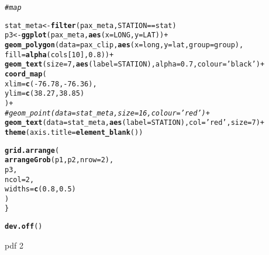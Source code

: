 \documentclass[letterpaper,12pt]{article}\usepackage[]{graphicx}\usepackage[]{color}
\makeatletter
\newcommand{\hlnum}[1]{\textcolor[rgb]{0.686,0.059,0.569}{#1}}%
\newcommand{\hlstr}[1]{\textcolor[rgb]{0.192,0.494,0.8}{#1}}%
\newcommand{\hlcom}[1]{\textcolor[rgb]{0.678,0.584,0.686}{\textit{#1}}}%
\newcommand{\hlopt}[1]{\textcolor[rgb]{0,0,0}{#1}}%
\newcommand{\hlstd}[1]{\textcolor[rgb]{0.345,0.345,0.345}{#1}}%
\newcommand{\hlkwb}[1]{\textcolor[rgb]{0.69,0.353,0.396}{#1}}%
\newcommand{\hlkwc}[1]{\textcolor[rgb]{0.333,0.667,0.333}{#1}}%
\newcommand{\hlkwd}[1]{\textcolor[rgb]{0.737,0.353,0.396}{\textbf{#1}}}%
\newenvironment{kframe}{%
 \def\at@end@of@kframe{}%
 \ifinner\ifhmode%
  \def\at@end@of@kframe{\end{minipage}}%
  \begin{minipage}{\columnwidth}%
 \fi\fi%
 \def\FrameCommand##1{\hskip\@totalleftmargin \hskip-\fboxsep
 \colorbox{shadecolor}{##1}\hskip-\fboxsep
     \hskip-\linewidth \hskip-\@totalleftmargin \hskip\columnwidth}%
 \MakeFramed {\advance\hsize-\width
   \@totalleftmargin\z@ \linewidth\hsize
   \@setminipage}}%
 {\par\unskip\endMakeFramed%
 \at@end@of@kframe}
\makeatother
\begin{document}
\begin{kframe}
\begin{alltt}
  \hlcom{# map}

  \hlstd{stat_meta} \hlkwb{<-} \hlkwd{filter}\hlstd{(pax_meta, STATION} \hlopt{==} \hlstd{stat)}
  \hlstd{p3} \hlkwb{<-} \hlkwd{ggplot}\hlstd{(pax_meta,} \hlkwd{aes}\hlstd{(}\hlkwc{x} \hlstd{= LONG,} \hlkwc{y} \hlstd{= LAT))} \hlopt{+}
    \hlkwd{geom_polygon}\hlstd{(}\hlkwc{data} \hlstd{= pax_clip,} \hlkwd{aes}\hlstd{(}\hlkwc{x} \hlstd{= long,} \hlkwc{y} \hlstd{= lat,} \hlkwc{group} \hlstd{= group),}
      \hlkwc{fill} \hlstd{=} \hlkwd{alpha}\hlstd{(cols[}\hlnum{10}\hlstd{],} \hlnum{0.8}\hlstd{))} \hlopt{+}
    \hlkwd{geom_text}\hlstd{(}\hlkwc{size} \hlstd{=} \hlnum{7}\hlstd{,} \hlkwd{aes}\hlstd{(}\hlkwc{label} \hlstd{= STATION),} \hlkwc{alpha} \hlstd{=} \hlnum{0.7}\hlstd{,} \hlkwc{colour} \hlstd{=} \hlstr{'black'}\hlstd{)} \hlopt{+}
    \hlkwd{coord_map}\hlstd{(}
      \hlkwc{xlim} \hlstd{=} \hlkwd{c}\hlstd{(}\hlopt{-}\hlnum{76.78}\hlstd{,} \hlopt{-}\hlnum{76.36}\hlstd{),}
      \hlkwc{ylim} \hlstd{=} \hlkwd{c}\hlstd{(}\hlnum{38.27}\hlstd{,} \hlnum{38.85}\hlstd{)}
    \hlstd{)} \hlopt{+}
    \hlcom{# geom_point(data = stat_meta, size = 16, colour = 'red') +}
    \hlkwd{geom_text}\hlstd{(}\hlkwc{data} \hlstd{= stat_meta,} \hlkwd{aes}\hlstd{(}\hlkwc{label} \hlstd{= STATION),} \hlkwc{col} \hlstd{=} \hlstr{'red'}\hlstd{,} \hlkwc{size} \hlstd{=} \hlnum{7}\hlstd{)} \hlopt{+}
    \hlkwd{theme}\hlstd{(}\hlkwc{axis.title} \hlstd{=} \hlkwd{element_blank}\hlstd{())}

  \hlkwd{grid.arrange}\hlstd{(}
    \hlkwd{arrangeGrob}\hlstd{(p1, p2,} \hlkwc{nrow} \hlstd{=} \hlnum{2}\hlstd{),}
    \hlstd{p3,}
    \hlkwc{ncol} \hlstd{=} \hlnum{2}\hlstd{,}
    \hlkwc{widths} \hlstd{=} \hlkwd{c}\hlstd{(}\hlnum{0.8}\hlstd{,} \hlnum{0.5}\hlstd{)}
    \hlstd{)}
\hlstd{\}}
\end{alltt}


{\ttfamily\noindent\bfseries{}}\begin{alltt}
\hlkwd{dev.off}\hlstd{()}
\end{alltt}
\end{kframe}pdf 
  2 
\end{document}
